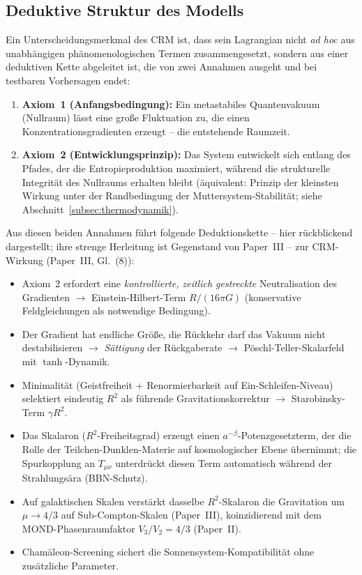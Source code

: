 \documentclass[aps,prd,twocolumn,superscriptaddress,nofootinbib]{revtex4-2}
\begin{document}
\subsection{Deduktive Struktur des Modells}
\label{subsec:deduktiv}

Ein Unterscheidungsmerkmal des CRM ist, dass sein Lagrangian nicht \textit{ad hoc} aus unabh\"angigen ph\"anomenologischen Termen zusammengesetzt, sondern aus einer deduktiven Kette abgeleitet ist, die von zwei Annahmen ausgeht und bei testbaren Vorhersagen endet:

\begin{enumerate}
\item \textbf{Axiom~1 (Anfangsbedingung):} Ein metastabiles Quantenvakuum (Nullraum) l\"asst eine gro\ss{}e Fluktuation zu, die einen Konzentrationsgradienten erzeugt -- die entstehende Raumzeit.
\item \textbf{Axiom~2 (Entwicklungsprinzip):} Das System entwickelt sich entlang des Pfades, der die Entropieproduktion maximiert, w\"ahrend die strukturelle Integrit\"at des Nullraums erhalten bleibt (\"aquivalent: Prinzip der kleinsten Wirkung unter der Randbedingung der Muttersystem-Stabilit\"at; siehe Abschnitt~\ref{subsec:thermodynamik}).
\end{enumerate}

Aus diesen beiden Annahmen f\"uhrt folgende Deduktionskette -- hier r\"uckblickend dargestellt; ihre strenge Herleitung ist Gegenstand von Paper~III -- zur CRM-Wirkung (Paper~III, Gl.~(8)):
\begin{itemize}
\item Axiom~2 erfordert eine \textit{kontrollierte, zeitlich gestreckte} Neutralisation des Gradienten $\to$ Einstein-Hilbert-Term $R/(16\pi G)$ (konservative Feldgleichungen als notwendige Bedingung).
\item Der Gradient hat endliche Gr\"o\ss{}e, die R\"uckkehr darf das Vakuum nicht destabilisieren $\to$ \textit{S\"attigung} der R\"uckgaberate $\to$ P\"oschl-Teller-Skalarfeld mit $\tanh$-Dynamik.
\item Minimalit\"at (Geistfreiheit + Renormierbarkeit auf Ein-Schleifen-Niveau) selektiert eindeutig $R^2$ als f\"uhrende Gravitationskorrektur $\to$ Starobinsky-Term $\gamma R^2$.
\item Das Skalaron ($R^2$-Freiheitsgrad) erzeugt einen $a^{-\beta}$-Potenzgesetzterm, der die Rolle der Teilchen-Dunklen-Materie auf kosmologischer Ebene \"ubernimmt; die Spurkopplung an $T_{\mu\nu}$ unterdr\"uckt diesen Term automatisch w\"ahrend der Strahlungs\"ara (BBN-Schutz).
\item Auf galaktischen Skalen verst\"arkt dasselbe $R^2$-Skalaron die Gravitation um $\mu \to 4/3$ auf Sub-Compton-Skalen (Paper~III), koinzidierend mit dem MOND-Phasenraumfaktor $V_3/V_2 = 4/3$ (Paper~II).
\item Cham\"aleon-Screening sichert die Sonnensystem-Kompatibilit\"at ohne zus\"atzliche Parameter.
\end{itemize}
\end{document}

